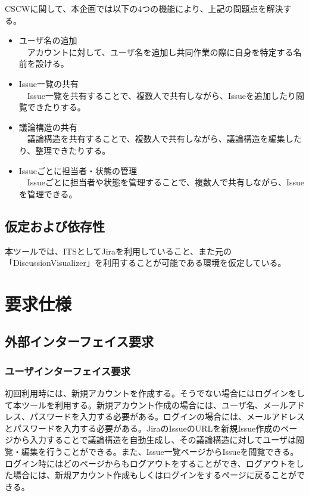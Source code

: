 \documentclass[12pt, oneside]{jreport}
\begin{document}
	CSCWに関して、本企画では以下の4つの機能により、上記の問題点を解決する。
	\begin{itemize}
		\item ユーザ名の追加
		\\
		　アカウントに対して、ユーザ名を追加し共同作業の際に自身を特定する名前を設ける。
		\item Issue一覧の共有
		\\
		　Issue一覧を共有することで、複数人で共有しながら、Issueを追加したり閲覧できたりする。
		\item 議論構造の共有
		\\
		　議論構造を共有することで、複数人で共有しながら、議論構造を編集したり、整理できたりする。
		\item Issueごとに担当者・状態の管理
		\\
		　Issueごとに担当者や状態を管理することで、複数人で共有しながら、Issueを管理できる。
	\end{itemize}

	\section{仮定および依存性}
	本ツールでは、ITSとしてJiraを利用していること、また元の「DiscussionVisualizer」を利用することが可能である環境を仮定している。

\chapter{要求仕様}

	\section{外部インターフェイス要求}
		
		\subsection{ユーザインターフェイス要求}
		初回利用時には、新規アカウントを作成する。そうでない場合にはログインをして本ツールを利用する。新規アカウント作成の場合には、ユーザ名、メールアドレス、パスワードを入力する必要がある。ログインの場合には、メールアドレスとパスワードを入力する必要がある。JiraのIssueのURLを新規Issue作成のページから入力することで議論構造を自動生成し、その議論構造に対してユーザは閲覧・編集を行うことができる。また、Issue一覧ページからIssueを閲覧できる。ログイン時にはどのページからもログアウトをすることができ、ログアウトをした場合には、新規アカウント作成もしくはログインをするページに戻ることができる。
	
\end{document}
